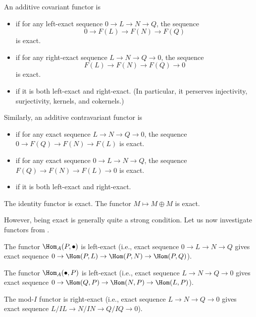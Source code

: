 \begin{definition}
    An additive covariant functor is 
    \begin{itemize}
    \item {} if for any left-exact sequence
    $0\to L\to N\to Q$,
    the sequence 
    $$0\to F(L)\to F(N)\to F(Q)$$ is exact.
    \item {} if for any right-exact sequence
    $L\to N\to Q\to 0$,
    the sequence $$F(L)\to F(N)\to F(Q)\to 0$$ 
    is exact.
    \item {} if it is both 
    left-exact and right-exact.
    (In particular, it perserves injectivity,
    surjectivity, kernels, and cokernels.)
    \end{itemize}
    Similarly, an additive contravariant functor is
    \begin{itemize}
    \item {} if for any exact sequence
    $L\to N\to Q\to 0$,
    the sequence $0\to F(Q)\to F(N)\to F(L)$ is exact.
    \item {} if for any exact sequence
    $0\to L\to N\to Q$,
    the sequence $F(Q)\to F(N)\to F(L)\to 0$ is exact.
    \item {} if it is both 
    left-exact and right-exact.
    \end{itemize}
\end{definition}
\begin{example}
    The identity functor is exact.
    The functor $M\mapsto M\oplus M$ is exact.
\end{example}
However, being exact is generally quite a strong condition.
Let us now investigate functors from .
\begin{proposition}
    \label{prop:left_right_exact}
    \begin{alphenum}
    \item The functor $\Hom_A(P,\bullet)$ is left-exact
    (i.e., exact sequence $0\to L\to N\to Q$
    gives exact sequence $0\to \Hom(P,L)\to\Hom(P,N)\to\Hom(P,Q)$).
    \item The functor $\Hom_A(\bullet,P)$ is left-exact
    (i.e., exact sequence $L\to N\to Q\to 0$
    gives exact sequence $0\to \Hom(Q,P)\to\Hom(N,P)\to\Hom(L,P)$).
    \item The mod-$I$ functor is right-exact
    (i.e., exact sequence $L\to N\to Q\to 0$
    gives exact sequence $L/IL\to N/IN\to Q/IQ\to 0$).
    \end{alphenum}
\end{proposition}
